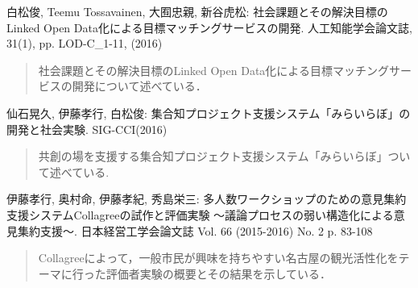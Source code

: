 
\begin{thebibliography}{99}

白松俊, Teemu Tossavainen, 大囿忠親, 新谷虎松: 社会課題とその解決目標のLinked Open Data化による目標マッチングサービスの開発. 人工知能学会論文誌, 31(1), pp. LOD-C\_1-11, (2016)
\begin{quote}
社会課題とその解決目標のLinked Open Data化による目標マッチングサービスの開発について述べている．
\end{quote}

仙石晃久, 伊藤孝行, 白松俊: 集合知プロジェクト支援システム「みらいらぼ」の開発と社会実験. SIG-CCI(2016)
\begin{quote}
共創の場を支援する集合知プロジェクト支援システム「みらいらぼ」ついて述べている.
\end{quote}

伊藤孝行, 奥村命, 伊藤孝紀, 秀島栄三: 多人数ワークショップのための意見集約支援システムCollagreeの試作と評価実験 ～議論プロセスの弱い構造化による意見集約支援～. 日本経営工学会論文誌 Vol. 66 (2015-2016) No. 2 p. 83-108
\begin{quote}
Collagreeによって，一般市民が興味を持ちやすい名古屋の観光活性化をテーマに行った評価者実験の概要とその結果を示している．
\end{quote}

\end{thebibliography}
